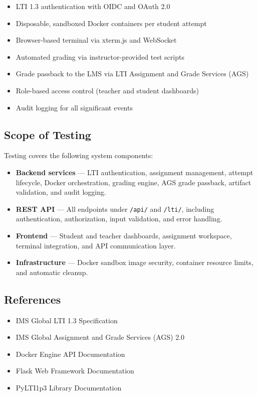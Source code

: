 \documentclass[12pt, letterpaper]{article}
\begin{document}
\begin{itemize}
    \item LTI 1.3 authentication with OIDC and OAuth 2.0
    \item Disposable, sandboxed Docker containers per student attempt
    \item Browser-based terminal via xterm.js and WebSocket
    \item Automated grading via instructor-provided test scripts
    \item Grade passback to the LMS via LTI Assignment and Grade Services (AGS)
    \item Role-based access control (teacher and student dashboards)
    \item Audit logging for all significant events
\end{itemize}

\subsection{Scope of Testing}
Testing covers the following system components:

\begin{itemize}
    \item \textbf{Backend services} --- LTI authentication, assignment management, attempt lifecycle, Docker orchestration, grading engine, AGS grade passback, artifact validation, and audit logging.
    \item \textbf{REST API} --- All endpoints under \texttt{/api/} and \texttt{/lti/}, including authentication, authorization, input validation, and error handling.
    \item \textbf{Frontend} --- Student and teacher dashboards, assignment workspace, terminal integration, and API communication layer.
    \item \textbf{Infrastructure} --- Docker sandbox image security, container resource limits, and automatic cleanup.
\end{itemize}

\subsection{References}
\begin{itemize}
    \item IMS Global LTI 1.3 Specification
    \item IMS Global Assignment and Grade Services (AGS) 2.0
    \item Docker Engine API Documentation
    \item Flask Web Framework Documentation
    \item PyLTI1p3 Library Documentation
\end{itemize}
\end{document}
